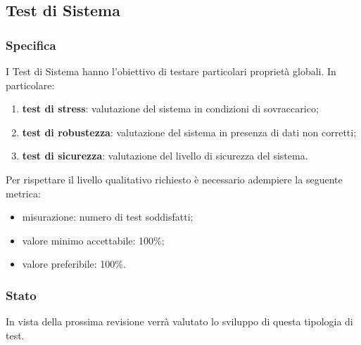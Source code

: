 \subsection{Test di Sistema}

	\subsubsection{Specifica}
		I Test di Sistema hanno l'obiettivo di testare particolari proprietà globali. In particolare:
		\begin{enumerate}
			\item{\textbf{test di stress}: valutazione del sistema in condizioni di sovraccarico;}
			\item{\textbf{test di robustezza}: valutazione del sistema in presenza di dati non corretti;}
			\item{\textbf{test di sicurezza}: valutazione del livello di sicurezza del sistema.}
		\end{enumerate}
		Per rispettare il livello qualitativo richiesto è necessario adempiere la seguente metrica:
		\begin{itemize}
			\item{misurazione: numero di test soddisfatti;}
			\item{valore minimo accettabile: 100\%;}
			\item{valore preferibile: 100\%.}
		\end{itemize}
	
	
	\subsubsection{Stato}
		In vista della prossima revisione verrà valutato lo sviluppo di questa tipologia di test.